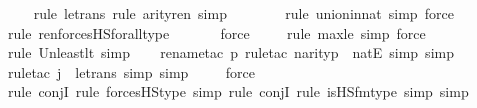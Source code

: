 \begin{isabellebody}
\ \ \ \isamarkupfalse%
{\isacharparenleft}{\kern0pt}rule\ le{\isacharunderscore}{\kern0pt}trans{\isacharcomma}{\kern0pt}\ rule\ arity{\isacharunderscore}{\kern0pt}ren{\isacharcomma}{\kern0pt}\ simp{\isacharparenright}{\kern0pt}\isanewline
\ \ \ \ \ \ \ \isamarkupfalse%
{\isacharparenleft}{\kern0pt}rule\ union{\isacharunderscore}{\kern0pt}in{\isacharunderscore}{\kern0pt}nat{\isacharcomma}{\kern0pt}\ simp{\isacharcomma}{\kern0pt}\ force{\isacharparenright}{\kern0pt}{\isacharplus}{\kern0pt}\isanewline
\ \ \ \ \ \isamarkupfalse%
{\isacharparenleft}{\kern0pt}rule\ ren{\isacharunderscore}{\kern0pt}forcesHS{\isacharunderscore}{\kern0pt}forall{\isacharunderscore}{\kern0pt}type{\isacharparenright}{\kern0pt}\isanewline
\ \ \ \ \ \isamarkupfalse%
\ force\isanewline
\ \ \ \ \isamarkupfalse%
{\isacharparenleft}{\kern0pt}rule\ max{\isacharunderscore}{\kern0pt}le{}{\isacharcomma}{\kern0pt}\ simp{\isacharcomma}{\kern0pt}\ force{\isacharparenright}{\kern0pt}\isanewline
\ \ \ \isamarkupfalse%
{\isacharparenleft}{\kern0pt}rule\ Un{\isacharunderscore}{\kern0pt}least{\isacharunderscore}{\kern0pt}lt{\isacharcomma}{\kern0pt}\ simp{\isacharparenright}{\kern0pt}\isanewline
\ \ \ \isamarkupfalse%
{\isacharparenleft}{\kern0pt}rename{\isacharunderscore}{\kern0pt}tac\ p{\isacharcomma}{\kern0pt}\ rule{\isacharunderscore}{\kern0pt}tac\ n{\isacharequal}{\kern0pt}{\isachardoublequoteopen}arity{\isacharparenleft}{\kern0pt}p{\isacharparenright}{\kern0pt}{\isachardoublequoteclose}\ \ natE{\isacharcomma}{\kern0pt}\ simp{\isacharcomma}{\kern0pt}\ simp{\isacharparenright}{\kern0pt}\isanewline
\ \ \ \ \isamarkupfalse%
{\isacharparenleft}{\kern0pt}rule{\isacharunderscore}{\kern0pt}tac\ j{\isacharequal}{\kern0pt}{}\ \ le{\isacharunderscore}{\kern0pt}trans{\isacharcomma}{\kern0pt}\ simp{\isacharcomma}{\kern0pt}\ simp{\isacharparenright}{\kern0pt}\isanewline
\ \ \ \isamarkupfalse%
\ force\ \isanewline
\ \ \isamarkupfalse%
{\isacharparenleft}{\kern0pt}rule\ conjI{\isacharcomma}{\kern0pt}\ rule\ forcesHS{\isacharprime}{\kern0pt}{\isacharunderscore}{\kern0pt}type{\isacharcomma}{\kern0pt}\ simp{\isacharcomma}{\kern0pt}\ rule\ conjI{\isacharcomma}{\kern0pt}\ rule\ is{\isacharunderscore}{\kern0pt}HS{\isacharunderscore}{\kern0pt}fm{\isacharunderscore}{\kern0pt}type{\isacharcomma}{\kern0pt}\ simp{\isacharcomma}{\kern0pt}\ simp{\isacharparenright}{\kern0pt}\isanewline
\ \ \isamarkupfalse%

\end{isabellebody}
